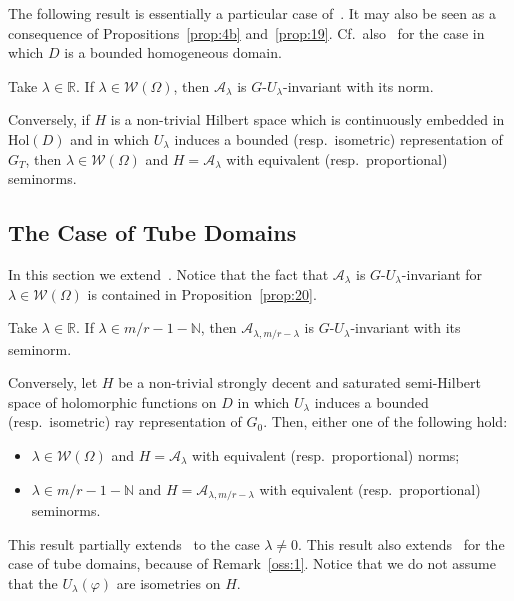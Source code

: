 \documentclass[10.5pt,reqno]{amsart}
\newcommand{\Hol}{\mathrm{Hol}}
\newcommand{\N}{\mathds{N}}
\newcommand{\R}{\mathds{R}}
\newcommand{\Ac}{\mathcal{A}}
\newcommand{\Wc}{\mathcal{W}}
\renewcommand{\phi}{\varphi}
\begin{document}
The following result is essentially a particular case of~\cite[Theorem 3]{ArazyFisher2}. It may also be seen as a consequence of Propositions~\ref{prop:4b} and~\ref{prop:19}. Cf.~also~\cite{Ishi6} for the case in which $D$ is a bounded homogeneous domain.

\begin{prop}\label{prop:20}
	Take $\lambda\in \R$. If $\lambda\in \Wc(\Omega)$, then $\Ac_{\lambda}$ is $G$-$U_\lambda$-invariant with its norm.
	
	Conversely, if $H$ is a non-trivial Hilbert space which is continuously embedded in $\Hol(D)$ and in which  $U_\lambda$ induces a bounded (resp.\ isometric) representation of $G_T$, then $\lambda\in \Wc(\Omega)$ and $H=\Ac_\lambda$ with equivalent (resp.\ proportional) seminorms.
\end{prop}


\subsection{The Case of Tube Domains}

In this section we extend~\cite{Garrigos}. Notice that the fact that $\Ac_\lambda$ is $G$-$U_\lambda$-invariant for $\lambda\in \Wc(\Omega)$ is contained in Proposition~\ref{prop:20}. 

\begin{teo}\label{teo:2}\label{teo:4}
	Take $\lambda\in \R$. 
	If $\lambda\in m/r-1-\N$, then $\Ac_{\lambda,m/r-\lambda}$ is $G$-$U_\lambda$-invariant with its seminorm.
	
	Conversely, let $H$ be a non-trivial strongly decent and saturated semi-Hilbert space of holomorphic functions on $D$ in which $U_\lambda$ induces a bounded (resp.\ isometric) ray representation of $G_0$. Then, either one of the following hold:
	\begin{itemize}
		\item $\lambda\in \Wc(\Omega)$ and $H=\Ac_{\lambda }$ with equivalent (resp.\ proportional) norms;
		
		\item $\lambda\in m/ r-1-\N$ and $H=\Ac_{\lambda, m /r-\lambda}$ with   equivalent (resp.\ proportional) seminorms. 
	\end{itemize}
\end{teo}


This result partially extends~\cite{Garrigos} to the case $\lambda\neq 0$. This result also extends~\cite[Theorem 5.2]{Arazy} for the case of tube domains, because of Remark~\ref{oss:1}. Notice that we do not assume that the $U_\lambda(\phi)$ are isometries on $H$.
\end{document}

